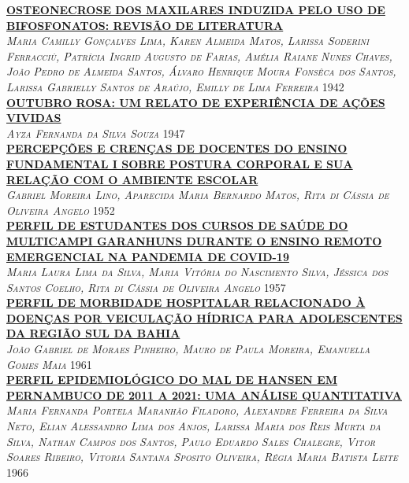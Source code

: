 \noindent \textsc{\hyperlink{trabalhos/251459.pdf.1}{\textbf{OSTEONECROSE DOS MAXILARES INDUZIDA PELO USO DE BIFOSFONATOS: REVISÃO DE LITERATURA}}}\\ 
\noindent \textsc{\textit{Maria Camilly Gonçalves Lima, Karen Almeida Matos, Larissa Soderini Ferracciù, Patrícia Ingrid Augusto de Farias, Amélia Raiane Nunes Chaves, João Pedro de Almeida Santos, Álvaro Henrique Moura Fonsêca dos Santos, Larissa Gabrielly Santos de Araújo, Emilly de Lima Ferreira}} \hfill 1942\\ 

\noindent \textsc{\hyperlink{trabalhos/251725.pdf.1}{\textbf{OUTUBRO ROSA: UM RELATO DE EXPERIÊNCIA DE AÇÕES VIVIDAS}}}\\ 
\noindent \textsc{\textit{Ayza Fernanda da Silva Souza}} \hfill 1947\\ 

\noindent \textsc{\hyperlink{trabalhos/248943.pdf.1}{\textbf{PERCEPÇÕES E CRENÇAS DE DOCENTES DO ENSINO FUNDAMENTAL I SOBRE POSTURA CORPORAL E SUA RELAÇÃO COM O AMBIENTE ESCOLAR}}}\\ 
\noindent \textsc{\textit{Gabriel Moreira Lino, Aparecida Maria Bernardo Matos, Rita di Cássia de Oliveira Angelo}} \hfill 1952\\ 

\noindent \textsc{\hyperlink{trabalhos/251597.pdf.1}{\textbf{PERFIL DE ESTUDANTES DOS CURSOS DE SAÚDE DO MULTICAMPI GARANHUNS DURANTE O ENSINO REMOTO EMERGENCIAL NA PANDEMIA DE COVID-19}}}\\ 
\noindent \textsc{\textit{Maria Laura Lima da Silva, Maria Vitória do Nascimento Silva, Jéssica dos Santos Coelho, Rita di Cássia de Oliveira Angelo}} \hfill 1957\\ 

\noindent \textsc{\hyperlink{trabalhos/250126.pdf.1}{\textbf{PERFIL DE MORBIDADE HOSPITALAR RELACIONADO À DOENÇAS POR VEICULAÇÃO HÍDRICA PARA ADOLESCENTES DA REGIÃO SUL DA BAHIA}}}\\ 
\noindent \textsc{\textit{João Gabriel de Moraes Pinheiro, Mauro de Paula Moreira, Emanuella Gomes Maia}} \hfill 1961\\ 

\noindent \textsc{\hyperlink{trabalhos/251707.pdf.1}{\textbf{PERFIL EPIDEMIOLÓGICO DO MAL DE HANSEN EM PERNAMBUCO DE 2011 A 2021: UMA ANÁLISE QUANTITATIVA }}}\\ 
\noindent \textsc{\textit{Maria Fernanda Portela Maranhão Filadoro, Alexandre Ferreira da Silva Neto, Elian Alessandro Lima dos Anjos, Larissa Maria dos Reis Murta da Silva, Nathan Campos dos Santos, Paulo Eduardo Sales Chalegre, Vitor Soares Ribeiro, Vitoria Santana Sposito Oliveira, Régia Maria Batista Leite}} \hfill 1966\\ 

